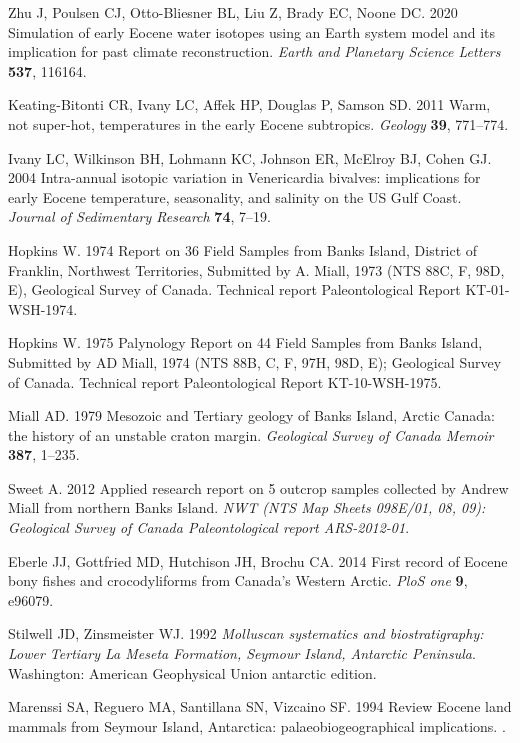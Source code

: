\documentclass[]{rsos}%
\begin{document}
\begin{thebibliography}{99}
Zhu J, Poulsen CJ, Otto-Bliesner BL, Liu Z, Brady EC, Noone DC. 2020
  Simulation of early Eocene water isotopes using an Earth system model and its
  implication for past climate reconstruction. {\em Earth and Planetary Science
  Letters} \textbf{537}, 116164.

Keating-Bitonti CR, Ivany LC, Affek HP, Douglas P, Samson SD. 2011  Warm, not
  super-hot, temperatures in the early Eocene subtropics. {\em Geology}
  \textbf{39}, 771--774.

Ivany LC, Wilkinson BH, Lohmann KC, Johnson ER, McElroy BJ, Cohen GJ. 2004
  Intra-annual isotopic variation in Venericardia bivalves: implications for
  early Eocene temperature, seasonality, and salinity on the US Gulf Coast.
  {\em Journal of Sedimentary Research} \textbf{74}, 7--19.

Hopkins W. 1974  Report on 36 Field Samples from Banks Island, District of
  Franklin, Northwest Territories, Submitted by A. Miall, 1973 (NTS 88C, F,
  98D, E), Geological Survey of Canada. Technical report Paleontological Report
  KT-01-WSH-1974.

Hopkins W. 1975  Palynology Report on 44 Field Samples from Banks Island,
  Submitted by AD Miall, 1974 (NTS 88B, C, F, 97H, 98D, E); Geological Survey
  of Canada. Technical report Paleontological Report KT-10-WSH-1975.

Miall AD. 1979  {Mesozoic and Tertiary geology of Banks Island, Arctic Canada:
  the history of an unstable craton margin}. {\em Geological Survey of Canada
  Memoir} \textbf{387}, 1--235.

Sweet A. 2012  Applied research report on 5 outcrop samples collected by Andrew
  Miall from northern Banks Island. {\em NWT (NTS Map Sheets 098E/01, 08, 09):
  Geological Survey of Canada Paleontological report ARS-2012-01}.

Eberle JJ, Gottfried MD, Hutchison JH, Brochu CA. 2014  First record of Eocene
  bony fishes and crocodyliforms from Canada’s Western Arctic. {\em PloS one}
  \textbf{9}, e96079.

Stilwell JD, Zinsmeister WJ. 1992 {\em {Molluscan systematics and
  biostratigraphy: Lower Tertiary La Meseta Formation, Seymour Island,
  Antarctic Peninsula}}.
Washington: American Geophysical Union antarctic edition.

Marenssi SA, Reguero MA, Santillana SN, Vizcaino SF. 1994  {Review Eocene land
  mammals from Seymour Island, Antarctica: palaeobiogeographical implications}.
  .


\end{thebibliography}
\end{document}
